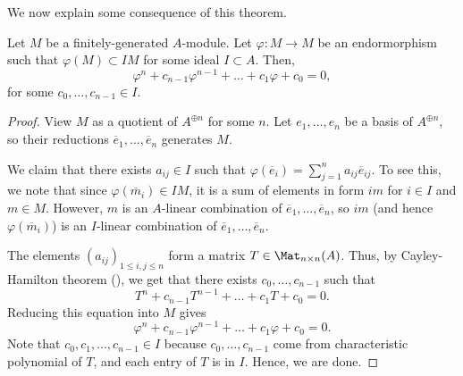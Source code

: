 We now explain some consequence of this theorem.
\begin{corollary}
    \label{cor:cayley_hamilton}
    Let $M$ be a finitely-generated $A$-module.
    Let $\varphi : M\to M$ be an endormorphism
    such that $\varphi(M) \subset IM$ for some ideal $I\subset A$.
    Then,
    $$\varphi^n + c_{n-1}\varphi^{n-1} + \dots + c_1\varphi + c_0 
    = 0,$$
    for some $c_0,\dots,c_{n-1}\in I$.
\end{corollary}
\begin{proof}
    View $M$ as a quotient of $A^{\oplus n}$ for some $n$.
    Let $e_1,\dots,e_n$ be a basis of $A^{\oplus n}$,
    so their reductions $\overline e_1, \dots, \overline e_n$
    generates $M$.

    We claim that there exists $a_{ij}\in I$ such that
    $\varphi(\overline e_i) = \sum_{j=1}^n a_{ij} \overline e_{ij}$.
    To see this, we note that since $\varphi(\overline m_i)
    \in IM$, it is a sum of elements in form $im$
    for $i\in I$ and $m\in M$.
    However, $m$ is an $A$-linear combination of $\overline e_1,\dots,\overline e_n$,
    so $im$ (and hence $\varphi(\overline m_i)$)
    is an $I$-linear combination of $\overline e_1,\dots,\overline e_n$.

    The elements $(a_{ij})_{1\leq i,j\leq n}$ form a matrix 
    $T\in \Mat_{n\times n} (A)$.
    Thus, by Cayley-Hamilton theorem (), we get that
    there exists $c_0,\dots,c_{n-1}$ such that
    $$T^n + c_{n-1}T^{n-1} + \dots + c_1T + c_0 = 0.$$
    Reducing this equation into $M$ gives
    $$\varphi^n + c_{n-1}\varphi^{n-1} + \dots + c_1\varphi + c_0=0.$$
    Note that $c_0,c_1,\dots,c_{n-1}\in I$
    because $c_0,\dots,c_{n-1}$ come from characteristic polynomial of $T$, and each entry of $T$ is in $I$. 
    Hence, we are done.
\end{proof}
